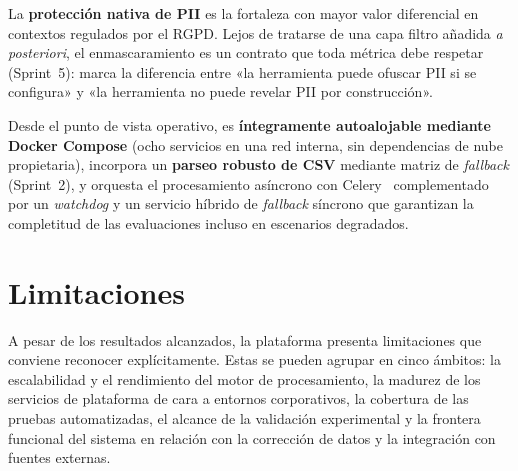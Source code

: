 La \textbf{protección nativa de \acs{PII}} es la fortaleza con mayor
valor diferencial en contextos regulados por el \ac{RGPD}.  Lejos de
tratarse de una capa filtro añadida \emph{a posteriori}, el
enmascaramiento es un contrato que toda métrica debe respetar
(Sprint~5): marca la diferencia entre «la herramienta puede ofuscar
\acs{PII} si se configura» y «la herramienta no puede revelar
\acs{PII} por construcción».

Desde el punto de vista operativo, \dataqual es \textbf{íntegramente
autoalojable mediante Docker Compose} (ocho servicios en una red
interna, sin dependencias de nube propietaria), incorpora un
\textbf{parseo robusto de \ac{CSV}} mediante matriz de \emph{fallback}
(Sprint~2), y orquesta el procesamiento asíncrono con
Celery~\citep{celery} complementado por un \emph{watchdog} y un
servicio híbrido de \emph{fallback} síncrono que garantizan la
completitud de las evaluaciones incluso en escenarios degradados.


\section{Limitaciones}
\label{sec:limitaciones}

A pesar de los resultados alcanzados, la plataforma presenta limitaciones
que conviene reconocer explícitamente.  Estas se pueden agrupar en cinco
ámbitos: la escalabilidad y el rendimiento del motor de procesamiento,
la madurez de los servicios de plataforma de cara a entornos
corporativos, la cobertura de las pruebas automatizadas, el alcance de
la validación experimental y la frontera funcional del sistema en
relación con la corrección de datos y la integración con fuentes
externas.

